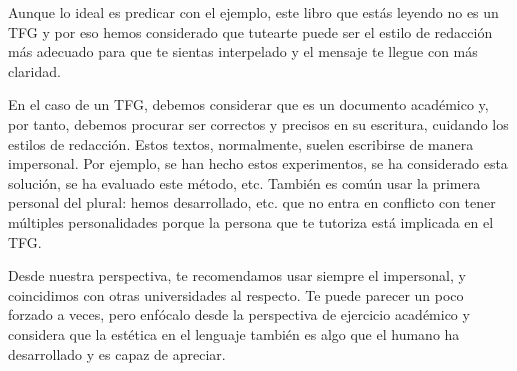 
Aunque lo ideal es predicar con el ejemplo, este libro que estás leyendo no es un TFG y por eso hemos considerado que tutearte puede ser el estilo de redacción más adecuado para que te sientas interpelado y el mensaje te llegue con más claridad. 

En el caso de un TFG, debemos considerar que es un documento académico y, por tanto, debemos procurar ser correctos y precisos en su escritura, cuidando los estilos de redacción. Estos textos, normalmente, suelen escribirse de manera impersonal. Por ejemplo, se han hecho estos experimentos, se ha considerado esta solución, se ha evaluado este método, etc. También es común usar la primera personal del plural: hemos desarrollado, etc. que no entra en conflicto con tener múltiples personalidades porque la persona que te tutoriza está implicada en el TFG. 

Desde nuestra perspectiva, te recomendamos usar siempre el impersonal, y coincidimos con otras universidades al respecto. Te puede parecer un poco forzado a veces, pero enfócalo desde la perspectiva de ejercicio académico y considera que la estética en el lenguaje también es algo que el humano ha desarrollado y es capaz de apreciar.

